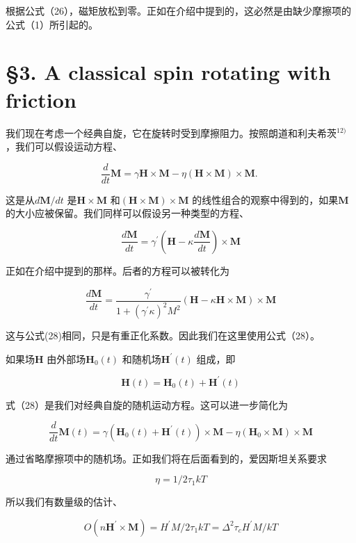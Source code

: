 \documentclass[10pt]{article}
\begin{document}
根据公式（26），磁矩放松到零。正如在介绍中提到的，这必然是由缺少摩擦项的公式（1）所引起的。

\section{§3. A classical spin rotating with friction} 
我们现在考虑一个经典自旋，它在旋转时受到摩擦阻力。按照朗道和利夫希茨\(^{12)}\) ，我们可以假设运动方程、

\[
\frac{d}{d t} \boldsymbol{M}=\gamma \boldsymbol{H} \times \boldsymbol{M}-\eta(\boldsymbol{H} \times \boldsymbol{M}) \times \boldsymbol{M} \text {. }
\] 

这是从\(d \boldsymbol{M} / d t\) 是\(\boldsymbol{H} \times \boldsymbol{M}\) 和\((\boldsymbol{H} \times \boldsymbol{M}) \times \boldsymbol{M}\) 的线性组合的观察中得到的，如果\(\boldsymbol{M}\) 的大小应被保留。我们同样可以假设另一种类型的方程、

\[
\frac{d \boldsymbol{M}}{d t}=\gamma^{\prime}\left(\boldsymbol{H}-\kappa \frac{d \boldsymbol{M}}{d t}\right) \times \boldsymbol{M}
\] 

正如在介绍中提到的那样。后者的方程可以被转化为

\[
\frac{d \boldsymbol{M}}{d t}=\frac{\gamma^{\prime}}{1+\left(\gamma^{\prime} \kappa\right)^{2} M^{2}}(\boldsymbol{H}-\kappa \boldsymbol{H} \times \boldsymbol{M}) \times \boldsymbol{M}
\] 

这与公式(28)相同，只是有重正化系数。因此我们在这里使用公式（28）。

如果场\(\boldsymbol{H}\) 由外部场\(\boldsymbol{H}_{0}(t)\) 和随机场\(\boldsymbol{H}^{\prime}(t)\) 组成，即

\[
\boldsymbol{H}(t)=\boldsymbol{H}_{0}(t)+\boldsymbol{H}^{\prime}(t)
\] 

式（28）是我们对经典自旋的随机运动方程。这可以进一步简化为

\[
\frac{d}{d t} \boldsymbol{M}(t)=\gamma\left(\boldsymbol{H}_{0}(t)+\boldsymbol{H}^{\prime}(t)\right) \times \boldsymbol{M}-\eta\left(\boldsymbol{H}_{0} \times \boldsymbol{M}\right) \times \boldsymbol{M}
\] 

通过省略摩擦项中的随机场。正如我们将在后面看到的，爱因斯坦关系要求

\[
\eta=1 / 2 \tau_{1} k T
\] 

所以我们有数量级的估计、

\[
O\left(n \boldsymbol{H}^{\prime} \times \boldsymbol{M}\right)=H^{\prime} M / 2 \tau_{1} k T=\Delta^{2} \tau_{c} H^{\prime} M / k T
\] 
\end{document}
